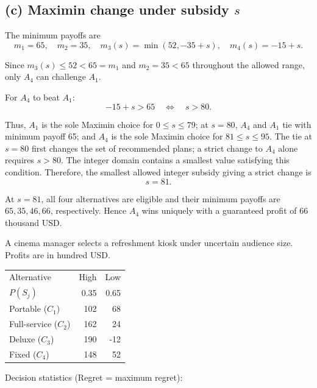 \secInicio[sec:q1]

\label{sol:q1c}
\subsection*{(c) Maximin change under subsidy $s$ }

The minimum payoffs are
\[
m_1=65,\quad m_2=35,\quad
m_3(s)=\min(52,-35+s),\quad m_4(s)=-15+s.
\]

Since $m_3(s)\le52<65=m_1$ and $m_2=35<65$ throughout
the allowed range, only $A_4$ can challenge $A_1$.

For $A_4$ to beat $A_1$:
\[
-15+s>65
\quad\Longleftrightarrow\quad s>80.
\]

Thus, $A_1$ is the sole Maximin choice for $0\le s\le79$;
at $s=80$, $A_4$ and $A_1$ tie with minimum payoff 65;
and $A_4$ is the sole Maximin choice for $81\le s\le95$.
The tie at $s=80$ first changes the set of recommended plans;
a strict change to $A_4$ alone requires $s>80$.
The integer domain contains a smallest value satisfying this condition.
Therefore, the smallest allowed integer subsidy giving a strict change is
\[
\boxed{s=81}.
\]

At $s=81$, all four alternatives are eligible and their minimum
payoffs are $65,35,46,66$, respectively. Hence $A_4$ wins uniquely
with a guaranteed profit of 66 thousand USD.
\secInicio[sec:q1]



A cinema manager selects a refreshment kiosk under uncertain audience size. Profits are in hundred USD.

\begin{center}\small\setlength{\tabcolsep}{4pt}
	\begin{tabular}{lrr}\toprule
		Alternative & High & Low\\
		$P(S_j)$ & 0.35 & 0.65\\ \midrule
				Portable ($C_1$) & 102 & 68\\
		Full-service ($C_2$) & 162 & 24\\
		Deluxe ($C_3$) & 190 & -12\\
		Fixed ($C_4$) & 148 & 52\\
		\bottomrule
	\end{tabular}
\end{center} \vspace{-3mm}

Decision statistics (Regret = maximum regret):

